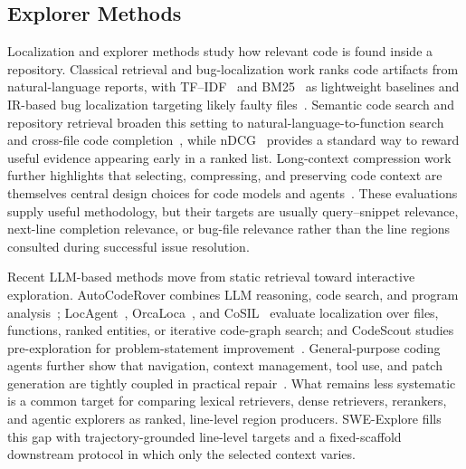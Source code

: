 

\subsection{Explorer Methods}

Localization and explorer methods study how relevant code is found inside a repository. Classical retrieval and bug-localization work ranks code artifacts from natural-language reports, with TF--IDF~\citep{salton1988termweighting} and BM25~\citep{robertson2009bm25} as lightweight baselines and IR-based bug localization targeting likely faulty files~\citep{zhou2012buglocator}. Semantic code search and repository retrieval broaden this setting to natural-language-to-function search and cross-file code completion~\citep{husain2019codesearchnet,liu2024repobench}, while nDCG~\citep{jarvelin2002ndcg} provides a standard way to reward useful evidence appearing early in a ranked list. Long-context compression work further highlights that selecting, compressing, and preserving code context are themselves central design choices for code models and agents~\citep{shi2025longcodezip,wang2026context}. These evaluations supply useful methodology, but their targets are usually query--snippet relevance, next-line completion relevance, or bug-file relevance rather than the line regions consulted during successful issue resolution.

Recent LLM-based methods move from static retrieval toward interactive exploration. AutoCodeRover combines LLM reasoning, code search, and program analysis~\citep{zhang2024autocoderover}; LocAgent~\citep{chen2025locagent}, OrcaLoca~\citep{yu2025orcaloca}, and CoSIL~\citep{jiang2025issuelocalizationllmdriveniterative} evaluate localization over files, functions, ranked entities, or iterative code-graph search; and CodeScout studies pre-exploration for problem-statement improvement~\citep{suri2026codescout}. General-purpose coding agents further show that navigation, context management, tool use, and patch generation are tightly coupled in practical repair~\citep{yang2024sweagent,wang2024openhands,xia2024agentless,anthropic2025claudecode,chen2026beyondswecurrentcodeagent}. What remains less systematic is a common target for comparing lexical retrievers, dense retrievers, rerankers, and agentic explorers as ranked, line-level region producers. SWE-Explore fills this gap with trajectory-grounded line-level targets and a fixed-scaffold downstream protocol in which only the selected context varies.



\FloatBarrier
